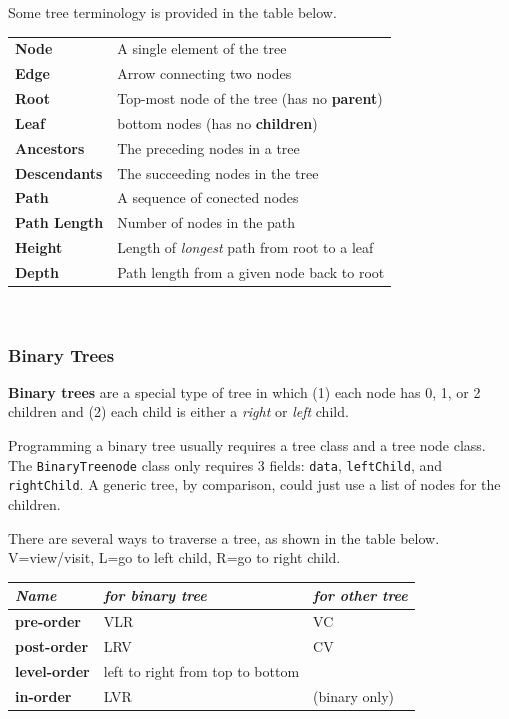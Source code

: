 Some tree terminology is provided in the table below. \\

\begin{tabular}{p{}p{}}
\textbf{Node} & A single element of the tree \\
\textbf{Edge} & Arrow connecting two nodes \\
\textbf{Root} & Top-most node of the tree (has no \textbf{parent}) \\
\textbf{Leaf} & bottom nodes (has no \textbf{children}) \\
\textbf{Ancestors} & The preceding nodes in a tree \\
\textbf{Descendants} & The succeeding nodes in the tree \\
\textbf{Path} & A sequence of conected nodes \\
\textbf{Path Length} & Number of nodes in the path \\
\textbf{Height} & Length of \textit{longest} path from root to a leaf \\
\textbf{Depth} & Path length from a given node back to root \\
\end{tabular} \\

\subsubsection{Binary Trees}

\textbf{Binary trees} are a special type of tree in which (1) each node has 0, 1, or 2 children and (2) each child is either a \textit{right} or \textit{left} child. 

Programming a binary tree usually requires a tree class and a tree node class. The \texttt{BinaryTreenode} class only requires 3 fields: \texttt{data}, \texttt{leftChild}, and \texttt{rightChild}. A generic tree, by comparison, could just use a list of nodes for the children. 

There are several ways to traverse a tree, as shown in the table below. V=view/visit, L=go to left child, R=go to right child. \\

\begin{tabular}{p{}p{}p{}}
\textit{Name} & \textit{for binary tree} & \textit{for other tree} \\
\hline
\textbf{pre-order} & VLR & VC \\
\textbf{post-order} & LRV & CV \\
\textbf{level-order} & left to right from top to bottom \\
\textbf{in-order} & LVR & (binary only) \\
\end{tabular} \\

